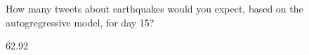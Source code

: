 \documentclass[11pt]{exam}
\begin{document}
\begin{questions}
\begin{parts}
  \end{parts}

  \question[6] How many tweets about earthquakes would you expect, based on
  the autogregressive model, for day 15?
  \begin{solutionordottedlines}[0.3in]
[1] 62.92  \end{solutionordottedlines}


\end{questions}

\begin{center} \gradetable[v][questions] \end{center}
\end{document}
